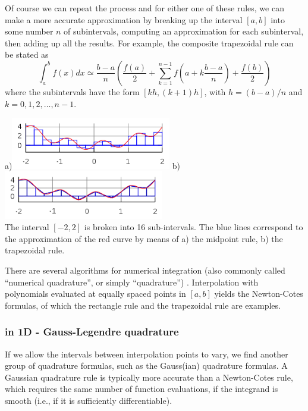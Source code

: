 Of course we can repeat the process and for either one of these rules, 
we can make a more accurate approximation by 
breaking up the interval $[a,b]$ into some number $n$ of subintervals, computing 
an approximation for each subinterval, then adding up all the results. 
For example, 
the composite trapezoidal rule can be stated as
\begin{equation}
\int_a^b f(x)dx \simeq \frac{b-a}{n} \left( \frac{f(a)}{2}  
+\sum_{k=1}^{n-1} f\left(a+k\frac{b-a}{n}\right)
   +\frac{f(b)}{2} \right)
\end{equation}
where the subintervals have the form $[kh,(k+1)h]$, with $h=(b-a)/n$ and $k=0,1,2,\dots,n-1$.


\begin{center}
a)\includegraphics[width=7cm]{images/quadrature/int1}
b)\includegraphics[width=7cm]{images/quadrature/int2}\\
The interval $[-2,2]$ is broken into 16 sub-intervals. The blue lines correspond to the 
approximation of the red curve by means of a) the midpoint rule,  b) the trapezoidal rule.
\end{center}

There are several algorithms for numerical integration (also commonly called ``{\color{olive}numerical quadrature}'', or
simply ``{\color{olive}quadrature}'') .
Interpolation with polynomials evaluated at equally spaced points in $[a,b]$
yields the Newton-Cotes formulas, of which the rectangle rule and the trapezoidal rule are examples. 

\subsubsection{in 1D - Gauss-Legendre quadrature  \label{sec:quad1Dglq}}

If we allow the intervals between interpolation points to vary, we find another group of quadrature formulas, such as 
the Gauss(ian) quadrature formulas. 
A Gaussian quadrature rule is typically more accurate than a Newton-Cotes rule, 
which requires the same number of function evaluations, if the integrand is smooth 
(i.e., if it is sufficiently differentiable).


